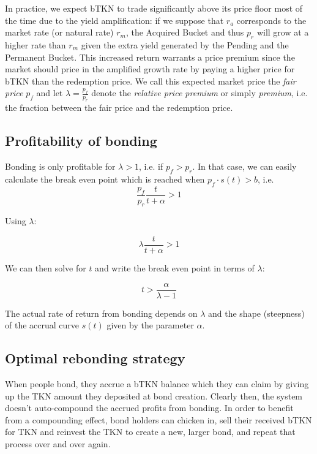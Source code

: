\documentclass{article}
\begin{document}
In practice, we expect bTKN to trade significantly above its price floor most of the time due to the yield amplification: if we suppose that $r_a$ corresponds to the market rate (or natural rate) $r_m$, the Acquired Bucket and thus $p_r$ will grow at a higher rate than $r_m$ given the extra yield generated by the Pending and the Permanent Bucket. This increased return warrants a price premium since the market should price in the amplified growth rate by paying a higher price for bTKN than the redemption price. We call this expected market price the \textit{fair price} $p_f$ and let $\lambda = \frac{p_f}{p_r}$ denote the \textit{relative price premium} or simply \textit{premium}, i.e. the fraction between the fair price and the redemption price.

\subsection{Profitability of bonding}
Bonding is only profitable for $\lambda>1$, i.e. if $p_f>p_r$. In that case, we can easily calculate the break even point which is reached when $p_f \cdot s(t)>b$, i.e.
\begin{equation}
  \label{eq:break_even_0}
\frac{p_f}{p_r}\frac{t}{t+\alpha} > 1
\end{equation}

Using $\lambda$:

\begin{equation}
  \label{eq:break_even_0}
\lambda\frac{t}{t+\alpha} > 1
\end{equation}

We can then solve for $t$ and write the break even point in terms of $\lambda$:

\begin{equation}
  \label{eq:break_even_2}
t > \frac{\alpha}{\lambda-1}
\end{equation}

The actual rate of return from bonding depends on $\lambda$ and the shape (steepness) of the accrual curve $s(t)$ given by the parameter $\alpha$.

\subsection{Optimal rebonding strategy}
  \label{sec:rebonding_strategy}
When people bond, they accrue a bTKN balance which they can claim by giving up the TKN amount they deposited at bond creation. Clearly then, the system doesn't auto-compound the accrued profits from bonding. In order to benefit from a compounding effect, bond holders can chicken in, sell their received bTKN for TKN and reinvest the TKN to create a new, larger bond, and repeat that process over and over again.
\end{document}
